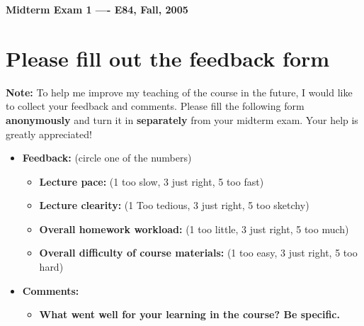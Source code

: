 \usepackage{html}

\begin{center}
{\Large \bf  Midterm Exam 1 ---- E84, Fall, 2005}
\end{center}

\section*{Please fill out the feedback form}

{\bf Note: } To help me improve my teaching of the course in the future, I would 
like to collect your feedback and comments. Please fill the following form 
{\bf anonymously} and turn it in {\bf separately} from your midterm exam. Your 
help is greatly appreciated!

\begin{itemize}
\item {\bf Feedback:} (circle one of the numbers)
\begin{itemize}

\item {\bf Lecture pace:} (1 too slow, 3 just right, 5 too fast)


\item {\bf Lecture clearity:} (1 Too tedious, 3 just right, 5 too sketchy)


\item {\bf Overall homework workload:} (1 too little, 3 just right, 5 too much)


\item {\bf Overall difficulty of course materials:} (1 too easy, 3 just right, 5 too hard)

\end{itemize} 

\item {\bf Comments:}
\begin{itemize}

\item {\bf What went well for your learning in the course? Be specific.}


\end{itemize}
\end{itemize}
